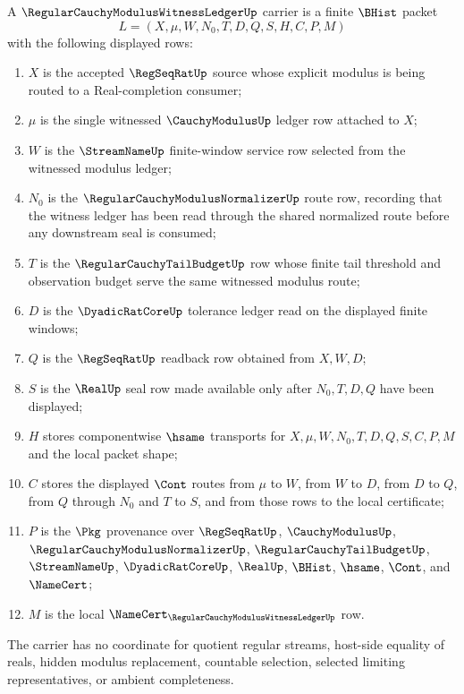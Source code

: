 \begin{definition}
\label{def:regular-cauchy-modulus-witness-ledger-carrier}
A $\RegularCauchyModulusWitnessLedgerUp$ carrier is a finite $\BHist$ packet
$$
L=(X,\mu,W,N_0,T,D,Q,S,H,C,P,M)
$$
with the following displayed rows:
\begin{enumerate}
\item $X$ is the accepted $\RegSeqRatUp$ source whose explicit modulus is being routed to a Real-completion consumer;
\item $\mu$ is the single witnessed $\CauchyModulusUp$ ledger row attached to $X$;
\item $W$ is the $\StreamNameUp$ finite-window service row selected from the witnessed modulus ledger;
\item $N_0$ is the $\RegularCauchyModulusNormalizerUp$ route row, recording that the witness ledger has been read through the shared normalized route before any downstream seal is consumed;
\item $T$ is the $\RegularCauchyTailBudgetUp$ row whose finite tail threshold and observation budget serve the same witnessed modulus route;
\item $D$ is the $\DyadicRatCoreUp$ tolerance ledger read on the displayed finite windows;
\item $Q$ is the $\RegSeqRatUp$ readback row obtained from $X,W,D$;
\item $S$ is the $\RealUp$ seal row made available only after $N_0,T,D,Q$ have been displayed;
\item $H$ stores componentwise $\hsame$ transports for $X,\mu,W,N_0,T,D,Q,S,C,P,M$ and the local packet shape;
\item $C$ stores the displayed $\Cont$ routes from $\mu$ to $W$, from $W$ to $D$, from $D$ to $Q$, from $Q$ through $N_0$ and $T$ to $S$, and from those rows to the local certificate;
\item $P$ is the $\Pkg$ provenance over $\RegSeqRatUp$, $\CauchyModulusUp$, $\RegularCauchyModulusNormalizerUp$, $\RegularCauchyTailBudgetUp$, $\StreamNameUp$, $\DyadicRatCoreUp$, $\RealUp$, $\BHist$, $\hsame$, $\Cont$, and $\NameCert$;
\item $M$ is the local $\NameCert_{\RegularCauchyModulusWitnessLedgerUp}$ row.
\end{enumerate}
The carrier has no coordinate for quotient regular streams, host-side equality of reals, hidden modulus replacement, countable selection, selected limiting representatives, or ambient completeness.
\end{definition}

